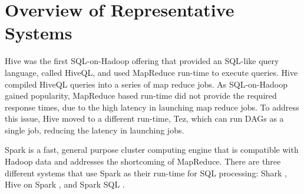 \documentclass{vldb}
\begin{document}
\section{Overview of Representative Systems}

Hive \cite{hive} was the first SQL-on-Hadoop offering that provided an SQL-like query language, called HiveQL, and used MapReduce run-time to execute queries. Hive compiled HiveQL queries into a series of map reduce jobs. 
As SQL-on-Hadoop gained popularity, MapReduce based run-time did not provide the required response times, due to the high latency in launching map reduce jobs. To address this issue, Hive moved to a different run-time, Tez, which can run DAGs as a single job, reducing the latency in launching jobs. 

Spark is a fast, general purpose cluster computing engine that is compatible with Hadoop data and addresses the shortcoming of MapReduce. There are three different systems that use Spark as their run-time for SQL processing: Shark \cite{sharksigmod13}, Hive on Spark \cite{hiveOnSpark}, and Spark SQL \cite{sparkSQL}. 


\end{document}
